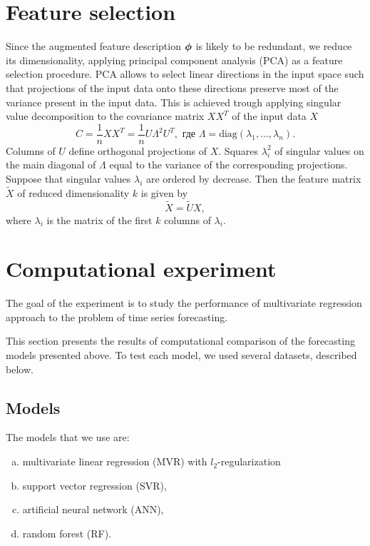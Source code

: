 \documentclass[conference]{IEEEtran}
\begin{document}
\section{Feature selection}
Since the augmented feature description ${\boldsymbol{\phi}}$ is likely to be redundant, we reduce its dimensionality, applying principal component analysis (PCA) as a feature selection procedure.
PCA allows to select linear directions in the input space such that projections of the input data onto these directions preserve most of the variance present in the input data. This is achieved trough applying singular value decomposition to the covariance matrix $X X^T$ of the input data $X$
 \[C = \frac{1}{n}X X^T = \frac{1}{n} U\Lambda^2 U^T, \text{ где } \Lambda = \text{diag}(\lambda_1, \dots, \lambda_n).\]
 Columns of $U$ define orthogonal projections of $X$. Squares $\lambda^2_i$ of singular values on the main diagonal of $\Lambda$ equal to the variance of the corresponding projections. Suppose that singular values $\lambda_i$ are ordered by decrease. Then the feature matrix $\tilde{X}$ of reduced dimensionality $k$ is given by
\begin{equation}\label{eq:PCA}
\tilde{X} = \tilde{U} X,\end{equation}
where $\lambda_i$ is the matrix of the first $k$ columns of $\lambda_i$.


\section{Computational experiment}
The goal of the experiment is to study the performance of multivariate regression approach to the problem of
time series forecasting.

This section presents the results of computational comparison of the forecasting models presented above. To test each model, we used several datasets, described below.
\subsection{Models}
The models that we use are:
\begin{enumerate}[a)]
\item multivariate linear regression (MVR) with $l_2$-regularization
\item support vector regression (SVR),
\item artificial neural network (ANN),
\item random forest (RF).
\end{enumerate}
\end{document}
